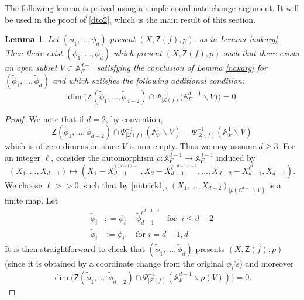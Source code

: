 \documentclass[10pt]{amsart}
\theoremstyle{plain}
\newtheorem{lemma}[thm]{Lemma}
\theoremstyle{definition}
\newcommand{\intersection}{\cap}
\renewcommand{\tilde}{\widetilde}
\newcommand{\A}{{\mathbb A}}
\let\syn\mathsf
\begin{document}
The following lemma is proved using a simple coordinate change argument. It will be used in the proof of \eqref{dto2}, which is the main result of this section. 
\begin{lemma}\label{normalizev}
Let $(\phi_1,...,\phi_d)$ present $(X,\syn{Z}(f),p)$.  as in Lemma \ref{nakarg}. Then there exist $(\tilde{\phi}_1, ... ,\tilde{\phi}_d)$ which present $(X,\syn{Z}(f),p)$ such that there exists an open subset $V \subset \A^{d-1}_F$ satisfying the conclusion of Lemma \ref{nakarg} for $(\tilde{\phi}_1, ... ,\tilde{\phi}_d)$ and which satisfies the following additional condition: 
$$ \dim\bigg( \syn{Z}(\tilde{\phi}_1, ... ,\tilde{\phi}_{d-2}) \intersection \Psi^{-1}_{|Z(f)}\big( \A^{d-1}_F \backslash V \big)\bigg)=0.$$
\end{lemma}
\begin{proof} We note that if $d=2$, by convention, 
$$\syn{Z}(\tilde{\phi}_1, ... ,\tilde{\phi}_{d-2}) \intersection {\Psi^{-1}_{|Z(f)}}(\A^{1}_F \backslash V) = {\Psi^{-1}_{|Z(f)}}(\A^1_F\backslash V) $$
which is of zero dimension since $V$ is non-empty. Thus we may assume $d\geq 3$. 
For an integer $\ell$, consider the automorphism  $\rho: \A^{d-1}_F\to \A^{d-1}_F$ induced by 
$$ (X_1,...,X_{d-1}) \mapsto (X_1-X_{d-1}^{\ell^{(d-1)-1}}, X_2-X_{d-1}^{\ell^{(d-1)-2}}, ..., X_{d-2}-X_{d-1}^{\ell^{1}}, X_{d-1}). $$ 
We choose $\ell >>0$, such that by \eqref{nntrick1}, $(X_1,...,X_{d-2})_{| \rho(\A^{d-1}\backslash V)}$ is a finite map. 
Let
\begin{align*}
 \tilde{\phi}_i  & : = {\phi}_i - \tilde{\phi}_{d-1}^{\ell^{d-1-i}} \ \ \ \  \text{for } \  i\leq d-2 \\
 \tilde{\phi}_i & := \phi_i  \ \ \ \ \ \ \text{for }  i=d-1,d
\end{align*}
It is then straightforward to check that  $(\tilde{\phi}_1,...,\tilde{\phi}_d)$ presents $(X,\syn{Z}(f),p)$ (since it is obtained by a coordinate change from the original $\phi_i$'s) and moreover 
$$ \dim\bigg( \syn{Z}(\tilde{\phi}_1, ... ,\tilde{\phi}_{d-2}) \intersection {\Psi^{-1}_{|Z(f)}} (\A^{d-1}_F \backslash \rho(V)) \bigg)=0.$$
\end{proof}
\end{document}
